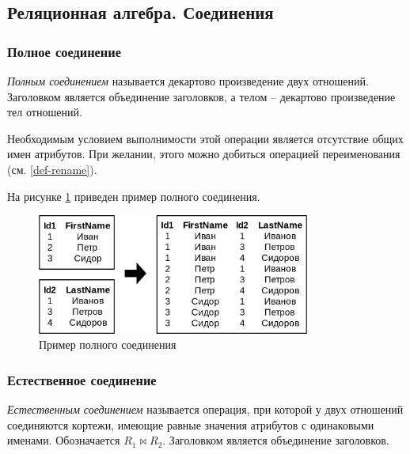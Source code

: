 \subsection{Реляционная алгебра. Соединения}

\subsubsection{Полное соединение}

\begin{definition}
	\textit{Полным соединением} называется декартово произведение двух отношений. Заголовком
	является объединение заголовков, а телом -- декартово произведение тел отношений.
\end{definition}

\begin{remark}
	Необходимым условием выполнимости этой операции является отсутствие общих имен атрибутов. При
	желании, этого можно добиться операцией переименования (см. \ref{def-rename}).
\end{remark}

На рисунке \ref{full-join-ex} приведен пример полного соединения.

\begin{figure}[H]
	\centering
	\includegraphics[width=0.8\textwidth]{../assets/kgeorgiy/relalgebra/Join_Full_2.svg.png}
	\caption{Пример полного соединения}
	\label{full-join-ex}
\end{figure}

\subsubsection{Естественное соединение}\label{nat-join-def}

\begin{definition}
	\textit{Естественным соединением} называется операция, при которой у двух отношений соединяются
	кортежи, имеющие равные значения атрибутов с одинаковыми именами. Обозначается
	$R_1 \bowtie R_2$. Заголовком является объединение заголовков.
\end{definition}

